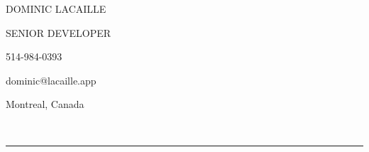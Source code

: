 \documentclass{article}
\begin{document}

\thispagestyle{empty}

\noindent
\begin{minipage}{12cm}
  \vspace{0.5em}
  {\fontsize{33}{33}\noindent\selectfont\avl\uppercase{Dominic Lacaille}\par}
  \vspace{1em}
  {\noindent\large\avul\uppercase{Senior Developer}\par}
\end{minipage}
\hfill
\begin{minipage}{4cm}
  {\faPhone*\hspace{1.5em}514-984-0393\par}
  \vspace{0.5em}
  {\faEnvelope\hspace{1.5em}dominic@lacaille.app\par}
  \vspace{0.5em}
  {\faCanadianMapleLeaf\hspace{1.5em}Montreal, Canada\par}
\end{minipage}

\

\par\noindent\rule{\textwidth}{0.4pt}

\vspace{3em}
\end{document}
